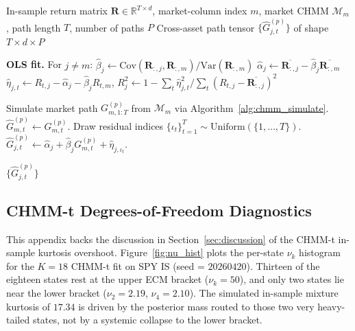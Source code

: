 \begin{algorithm}[tp]
\caption{Single Index Model (SIM) construction and simulation}
\label{alg:sim_build}
\small
\begin{algorithmic}[1]
\REQUIRE In-sample return matrix $\mathbf{R} \in \mathbb{R}^{T \times d}$, market-column index $m$, market CHMM $\mathcal{M}_m$, path length $T$, number of paths $P$
\ENSURE Cross-asset path tensor $\{\hat{G}^{(p)}_{j,t}\}$ of shape $T \times d \times P$

\STATE \textbf{OLS fit.} For $j \neq m$:
\STATE \quad $\hat{\beta}_j \leftarrow \text{Cov}(\mathbf{R}_{:,j}, \mathbf{R}_{:,m}) / \text{Var}(\mathbf{R}_{:,m})$
\STATE \quad $\hat{\alpha}_j \leftarrow \overline{\mathbf{R}_{:,j}} - \hat{\beta}_j \overline{\mathbf{R}_{:,m}}$
\STATE \quad $\hat{\eta}_{j,t} \leftarrow R_{t,j} - \hat{\alpha}_j - \hat{\beta}_j R_{t,m}$, \; $R^2_j \leftarrow 1 - \sum_t \hat{\eta}_{j,t}^2 / \sum_t (R_{t,j} - \overline{\mathbf{R}_{:,j}})^2$

    \STATE Simulate market path $G_{m,1:T}^{(p)}$ from $\mathcal{M}_m$ via Algorithm~\ref{alg:chmm_simulate}.
    \STATE $\hat{G}_{m,t}^{(p)} \leftarrow G_{m,t}^{(p)}$.
        \STATE Draw residual indices $\{\iota_t\}_{t=1}^T \sim \text{Uniform}(\{1, \dots, T\})$.
        \STATE $\hat{G}_{j,t}^{(p)} \leftarrow \hat{\alpha}_j + \hat{\beta}_j G_{m,t}^{(p)} + \hat{\eta}_{j,\iota_t}$.
    \ENDFOR
\ENDFOR

\RETURN $\{\hat{G}^{(p)}_{j,t}\}$
\end{algorithmic}
\end{algorithm}


\subsection{CHMM-t Degrees-of-Freedom Diagnostics}
\label{sec:nu_diagnostics}

This appendix backs the discussion in Section~\ref{sec:discussion} of the CHMM-t in-sample kurtosis overshoot.
Figure~\ref{fig:nu_hist} plots the per-state $\nu_k$ histogram for the $K = 18$ CHMM-t fit on SPY IS (seed = $20260420$).
Thirteen of the eighteen states rest at the upper ECM bracket ($\nu_k = 50$), and only two states lie near the lower bracket ($\nu_2 = 2.19$, $\nu_4 = 2.10$).
The simulated in-sample mixture kurtosis of $17.34$ is driven by the posterior mass routed to those two very heavy-tailed states, not by a systemic collapse to the lower bracket.

